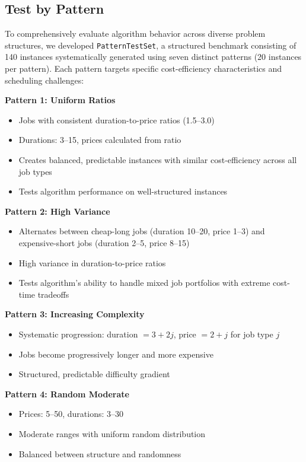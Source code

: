 \subsection{Test by Pattern}

To comprehensively evaluate algorithm behavior across diverse problem structures, we developed \texttt{PatternTestSet}, a structured benchmark consisting of 140 instances systematically generated using seven distinct patterns (20 instances per pattern). Each pattern targets specific cost-efficiency characteristics and scheduling challenges:

\textbf{Pattern 1: Uniform Ratios}
\begin{itemize}
    \item Jobs with consistent duration-to-price ratios (1.5--3.0)
    \item Durations: 3--15, prices calculated from ratio
    \item Creates balanced, predictable instances with similar cost-efficiency across all job types
    \item Tests algorithm performance on well-structured instances
\end{itemize}

\textbf{Pattern 2: High Variance}
\begin{itemize}
    \item Alternates between cheap-long jobs (duration 10--20, price 1--3) and expensive-short jobs (duration 2--5, price 8--15)
    \item High variance in duration-to-price ratios
    \item Tests algorithm's ability to handle mixed job portfolios with extreme cost-time tradeoffs
\end{itemize}

\textbf{Pattern 3: Increasing Complexity}
\begin{itemize}
    \item Systematic progression: duration $= 3 + 2j$, price $= 2 + j$ for job type $j$
    \item Jobs become progressively longer and more expensive
    \item Structured, predictable difficulty gradient
\end{itemize}

\textbf{Pattern 4: Random Moderate}
\begin{itemize}
    \item Prices: 5--50, durations: 3--30
    \item Moderate ranges with uniform random distribution
    \item Balanced between structure and randomness
\end{itemize}

